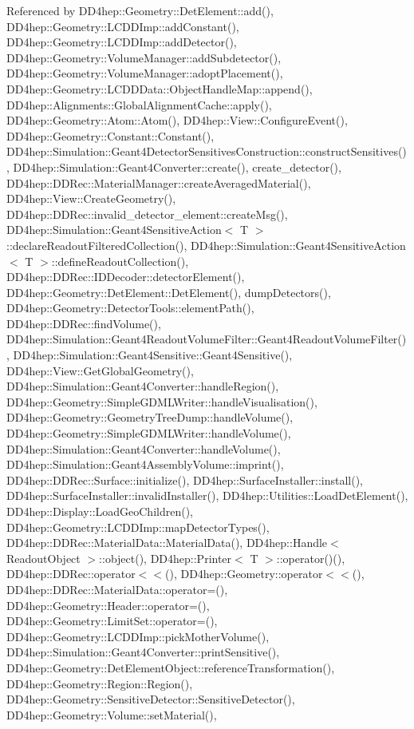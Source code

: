 Referenced by D\+D4hep\+::\+Geometry\+::\+Det\+Element\+::add(), D\+D4hep\+::\+Geometry\+::\+L\+C\+D\+D\+Imp\+::add\+Constant(), D\+D4hep\+::\+Geometry\+::\+L\+C\+D\+D\+Imp\+::add\+Detector(), D\+D4hep\+::\+Geometry\+::\+Volume\+Manager\+::add\+Subdetector(), D\+D4hep\+::\+Geometry\+::\+Volume\+Manager\+::adopt\+Placement(), D\+D4hep\+::\+Geometry\+::\+L\+C\+D\+D\+Data\+::\+Object\+Handle\+Map\+::append(), D\+D4hep\+::\+Alignments\+::\+Global\+Alignment\+Cache\+::apply(), D\+D4hep\+::\+Geometry\+::\+Atom\+::\+Atom(), D\+D4hep\+::\+View\+::\+Configure\+Event(), D\+D4hep\+::\+Geometry\+::\+Constant\+::\+Constant(), D\+D4hep\+::\+Simulation\+::\+Geant4\+Detector\+Sensitives\+Construction\+::construct\+Sensitives(), D\+D4hep\+::\+Simulation\+::\+Geant4\+Converter\+::create(), create\+\_\+detector(), D\+D4hep\+::\+D\+D\+Rec\+::\+Material\+Manager\+::create\+Averaged\+Material(), D\+D4hep\+::\+View\+::\+Create\+Geometry(), D\+D4hep\+::\+D\+D\+Rec\+::invalid\+\_\+detector\+\_\+element\+::create\+Msg(), D\+D4hep\+::\+Simulation\+::\+Geant4\+Sensitive\+Action$<$ T $>$\+::declare\+Readout\+Filtered\+Collection(), D\+D4hep\+::\+Simulation\+::\+Geant4\+Sensitive\+Action$<$ T $>$\+::define\+Readout\+Collection(), D\+D4hep\+::\+D\+D\+Rec\+::\+I\+D\+Decoder\+::detector\+Element(), D\+D4hep\+::\+Geometry\+::\+Det\+Element\+::\+Det\+Element(), dump\+Detectors(), D\+D4hep\+::\+Geometry\+::\+Detector\+Tools\+::element\+Path(), D\+D4hep\+::\+D\+D\+Rec\+::find\+Volume(), D\+D4hep\+::\+Simulation\+::\+Geant4\+Readout\+Volume\+Filter\+::\+Geant4\+Readout\+Volume\+Filter(), D\+D4hep\+::\+Simulation\+::\+Geant4\+Sensitive\+::\+Geant4\+Sensitive(), D\+D4hep\+::\+View\+::\+Get\+Global\+Geometry(), D\+D4hep\+::\+Simulation\+::\+Geant4\+Converter\+::handle\+Region(), D\+D4hep\+::\+Geometry\+::\+Simple\+G\+D\+M\+L\+Writer\+::handle\+Visualisation(), D\+D4hep\+::\+Geometry\+::\+Geometry\+Tree\+Dump\+::handle\+Volume(), D\+D4hep\+::\+Geometry\+::\+Simple\+G\+D\+M\+L\+Writer\+::handle\+Volume(), D\+D4hep\+::\+Simulation\+::\+Geant4\+Converter\+::handle\+Volume(), D\+D4hep\+::\+Simulation\+::\+Geant4\+Assembly\+Volume\+::imprint(), D\+D4hep\+::\+D\+D\+Rec\+::\+Surface\+::initialize(), D\+D4hep\+::\+Surface\+Installer\+::install(), D\+D4hep\+::\+Surface\+Installer\+::invalid\+Installer(), D\+D4hep\+::\+Utilities\+::\+Load\+Det\+Element(), D\+D4hep\+::\+Display\+::\+Load\+Geo\+Children(), D\+D4hep\+::\+Geometry\+::\+L\+C\+D\+D\+Imp\+::map\+Detector\+Types(), D\+D4hep\+::\+D\+D\+Rec\+::\+Material\+Data\+::\+Material\+Data(), D\+D4hep\+::\+Handle$<$ Readout\+Object $>$\+::object(), D\+D4hep\+::\+Printer$<$ T $>$\+::operator()(), D\+D4hep\+::\+D\+D\+Rec\+::operator$<$$<$(), D\+D4hep\+::\+Geometry\+::operator$<$$<$(), D\+D4hep\+::\+D\+D\+Rec\+::\+Material\+Data\+::operator=(), D\+D4hep\+::\+Geometry\+::\+Header\+::operator=(), D\+D4hep\+::\+Geometry\+::\+Limit\+Set\+::operator=(), D\+D4hep\+::\+Geometry\+::\+L\+C\+D\+D\+Imp\+::pick\+Mother\+Volume(), D\+D4hep\+::\+Simulation\+::\+Geant4\+Converter\+::print\+Sensitive(), D\+D4hep\+::\+Geometry\+::\+Det\+Element\+Object\+::reference\+Transformation(), D\+D4hep\+::\+Geometry\+::\+Region\+::\+Region(), D\+D4hep\+::\+Geometry\+::\+Sensitive\+Detector\+::\+Sensitive\+Detector(), D\+D4hep\+::\+Geometry\+::\+Volume\+::set\+Material(), 